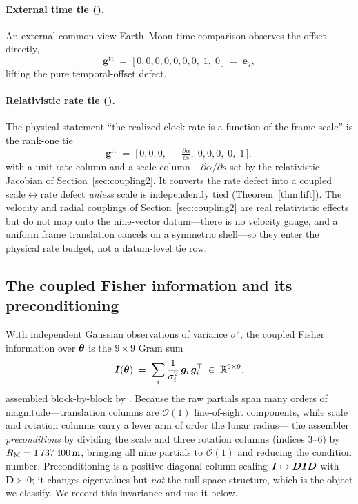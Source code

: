 \paragraph{External time tie ().}
An external common-view Earth--Moon time comparison observes the offset directly,
\begin{equation}
  \bm g^{\mathrm{tt}}
  \;=\;
  \bigl[\,0,0,0,0,0,0,0,\;1,\;0\,\bigr]
  \;=\; \bm e_7 ,
  \label{eq:timetie}
\end{equation}
lifting the pure temporal-offset defect.

\paragraph{Relativistic rate tie ().}
The physical statement ``the realized clock rate is a function of the frame scale'' is the
rank-one tie
\begin{equation}
  \bm g^{\mathrm{rt}}
  \;=\;
  \bigl[\,0,0,0,\;-\tfrac{\partial\alpha}{\partial s},\;0,0,0,\;0,\;1\,\bigr],
  \label{eq:ratetie}
\end{equation}
with a unit rate column and a scale column $-\partial\alpha/\partial s$ set by the
relativistic Jacobian of Section~\ref{sec:coupling2}. It converts the rate defect into a
coupled scale$\leftrightarrow$rate defect \emph{unless} scale is independently tied
(Theorem~\ref{thm:lift}). The velocity and radial couplings of Section~\ref{sec:coupling2}
are real relativistic effects but do not map onto the nine-vector datum---there is no
velocity gauge, and a uniform frame translation cancels on a symmetric shell---so they
enter the physical rate budget, not a datum-level tie row.

\subsection{The coupled Fisher information and its preconditioning}
\label{sec:fisher}

With independent Gaussian observations of variance $\sigma^2$, the coupled Fisher
information over $\bm{\theta}$ is the $9\times9$ Gram sum
\begin{equation}
  \bm{I}(\bm{\theta})
  \;=\;
  \sum_i \frac{1}{\sigma_i^2}\,\bm g_i\,\bm g_i^\top
  \;\in\;\mathbb{R}^{9\times9},
  \label{eq:fisher}
\end{equation}
assembled block-by-block by . Because the raw partials span
many orders of magnitude---translation columns are $\mathcal{O}(1)$ line-of-sight
components, while scale and rotation columns carry a lever arm of order the lunar radius---%
the assembler \emph{preconditions} by dividing the scale and three rotation columns
(indices $3$--$6$) by $R_{\mathrm{M}}=\SI{1737400}{m}$, bringing all nine partials to
$\mathcal{O}(1)$ and reducing the condition number. Preconditioning is a positive diagonal
column scaling $\bm{I}\mapsto\bm D\bm{I}\bm D$ with $\bm D\succ0$; it changes eigenvalues but
\emph{not} the null-space structure, which is the object we classify. We record this
invariance and use it below.

